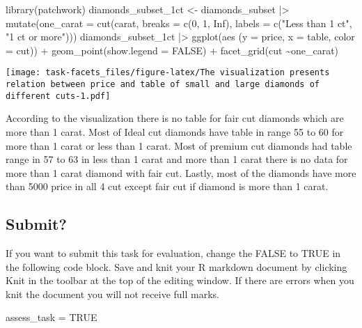 \documentclass[
]{article}
\newenvironment{Shaded}{\begin{snugshade}}{\end{snugshade}}
\newcommand{\AttributeTok}[1]{\textcolor[rgb]{0.77,0.63,0.00}{#1}}
\newcommand{\ConstantTok}[1]{\textcolor[rgb]{0.00,0.00,0.00}{#1}}
\newcommand{\DecValTok}[1]{\textcolor[rgb]{0.00,0.00,0.81}{#1}}
\newcommand{\FunctionTok}[1]{\textcolor[rgb]{0.00,0.00,0.00}{#1}}
\newcommand{\NormalTok}[1]{#1}
\newcommand{\OtherTok}[1]{\textcolor[rgb]{0.56,0.35,0.01}{#1}}
\newcommand{\SpecialCharTok}[1]{\textcolor[rgb]{0.00,0.00,0.00}{#1}}
\newcommand{\StringTok}[1]{\textcolor[rgb]{0.31,0.60,0.02}{#1}}
\begin{document}
\begin{Shaded}
\begin{Highlighting}[]
\FunctionTok{library}\NormalTok{(patchwork)}
\NormalTok{diamonds\_subset\_1ct }\OtherTok{\textless{}{-}}\NormalTok{ diamonds\_subset }\SpecialCharTok{|\textgreater{}} 
  \FunctionTok{mutate}\NormalTok{(}\AttributeTok{one\_carat =} \FunctionTok{cut}\NormalTok{(carat, }\AttributeTok{breaks =} \FunctionTok{c}\NormalTok{(}\DecValTok{0}\NormalTok{, }\DecValTok{1}\NormalTok{, }\ConstantTok{Inf}\NormalTok{), }
                \AttributeTok{labels =} \FunctionTok{c}\NormalTok{(}\StringTok{"Less than 1 ct"}\NormalTok{, }\StringTok{"1 ct or more"}\NormalTok{)))}
\NormalTok{diamonds\_subset\_1ct }\SpecialCharTok{|\textgreater{}} \FunctionTok{ggplot}\NormalTok{(}\FunctionTok{aes}\NormalTok{ (}\AttributeTok{y =}\NormalTok{ price, }\AttributeTok{x =}\NormalTok{ table, }\AttributeTok{color =}\NormalTok{ cut)) }\SpecialCharTok{+} \FunctionTok{geom\_point}\NormalTok{(}\AttributeTok{show.legend =} \ConstantTok{FALSE}\NormalTok{) }\SpecialCharTok{+} \FunctionTok{facet\_grid}\NormalTok{(cut }\SpecialCharTok{\textasciitilde{}}\NormalTok{one\_carat)}
\end{Highlighting}
\end{Shaded}

\texttt{[image: task-facets\_files/figure-latex/The visualization presents relation between price and table of small and large diamonds of different cuts-1.pdf]}

According to the visualization there is no table for fair cut diamonds
which are more than 1 carat. Most of Ideal cut diamonds have table in
range 55 to 60 for more than 1 carat or less than 1 carat. Most of
premium cut diamonds had table range in 57 to 63 in less than 1 carat
and more than 1 carat there is no data for more than 1 carat diamond
with fair cut. Lastly, most of the diamonds have more than 5000 price in
all 4 cut except fair cut if diamond is more than 1 carat.

\hypertarget{submit}{%
\subsection{Submit?}\label{submit}}

If you want to submit this task for evaluation, change the FALSE to TRUE
in the following code block. Save and knit your R markdown document by
clicking Knit in the toolbar at the top of the editing window. If there
are errors when you knit the document you will not receive full marks.

\begin{Shaded}
\begin{Highlighting}[]
\NormalTok{assess\_task }\OtherTok{=} \ConstantTok{TRUE}
\end{Highlighting}
\end{Shaded}
\end{document}
